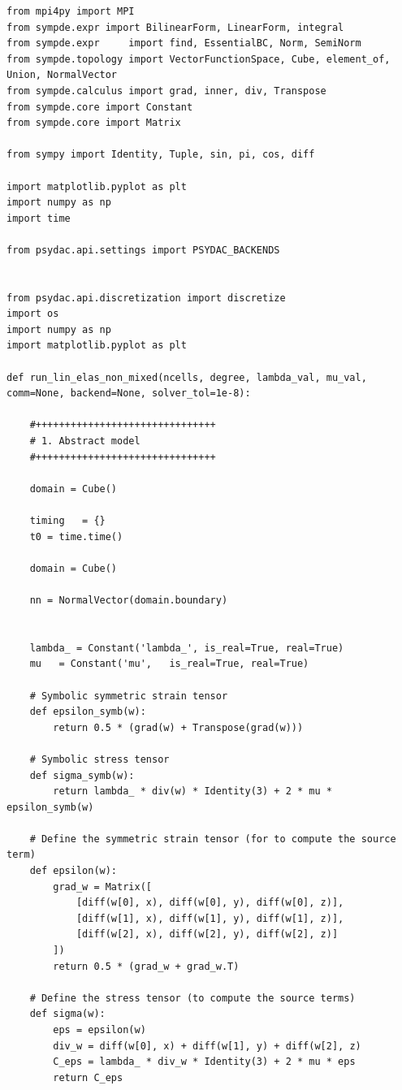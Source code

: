 \documentclass[a4paper,12pt,twoside]{report}
\begin{document}
\begin{lstlisting}[caption=Simulation code for the linear elasticity problem with Dirichlet boundary conditions.]
from mpi4py import MPI
from sympde.expr import BilinearForm, LinearForm, integral
from sympde.expr     import find, EssentialBC, Norm, SemiNorm
from sympde.topology import VectorFunctionSpace, Cube, element_of, Union, NormalVector
from sympde.calculus import grad, inner, div, Transpose
from sympde.core import Constant
from sympde.core import Matrix

from sympy import Identity, Tuple, sin, pi, cos, diff

import matplotlib.pyplot as plt
import numpy as np
import time

from psydac.api.settings import PSYDAC_BACKENDS


from psydac.api.discretization import discretize
import os
import numpy as np
import matplotlib.pyplot as plt

def run_lin_elas_non_mixed(ncells, degree, lambda_val, mu_val, comm=None, backend=None, solver_tol=1e-8):

    #+++++++++++++++++++++++++++++++
    # 1. Abstract model
    #+++++++++++++++++++++++++++++++

    domain = Cube()

    timing   = {}
    t0 = time.time()

    domain = Cube()

    nn = NormalVector(domain.boundary)


    lambda_ = Constant('lambda_', is_real=True, real=True)
    mu   = Constant('mu',   is_real=True, real=True)

    # Symbolic symmetric strain tensor
    def epsilon_symb(w):
        return 0.5 * (grad(w) + Transpose(grad(w)))

    # Symbolic stress tensor
    def sigma_symb(w):
        return lambda_ * div(w) * Identity(3) + 2 * mu * epsilon_symb(w)

    # Define the symmetric strain tensor (for to compute the source term)
    def epsilon(w): 
        grad_w = Matrix([
            [diff(w[0], x), diff(w[0], y), diff(w[0], z)],
            [diff(w[1], x), diff(w[1], y), diff(w[1], z)],
            [diff(w[2], x), diff(w[2], y), diff(w[2], z)]
        ])
        return 0.5 * (grad_w + grad_w.T)

    # Define the stress tensor (to compute the source terms)
    def sigma(w):
        eps = epsilon(w)
        div_w = diff(w[0], x) + diff(w[1], y) + diff(w[2], z)
        C_eps = lambda_ * div_w * Identity(3) + 2 * mu * eps
        return C_eps


\end{lstlisting}
\end{document}
